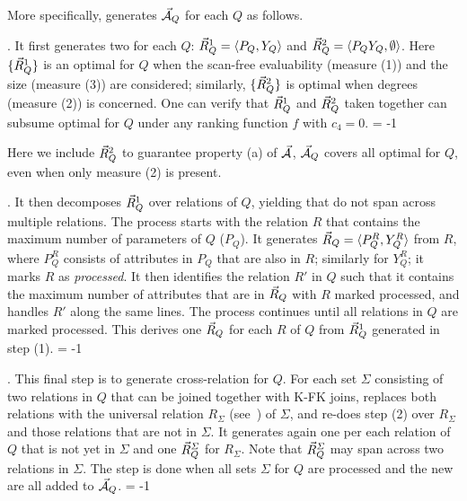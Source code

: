 More specifically, \usc generates $\vec{{\mathcal A}}_{Q}$ for each $Q$ as follows.

. It first generates two \bss for each $Q$:
$\vec{R}_{Q}^{1} = \langle P_{Q},\allowbreak Y_{Q}\rangle$ and $\vec{R}_{Q}^{2} =
\langle P_{Q}Y_{Q},\allowbreak \emptyset\rangle$. Here $\{\vec{R}_{Q}^{1}\}$ is
an optimal \bds for $Q$ when the scan-free evaluability (measure
(1))
and the size (measure (3)) are considered; similarly,
$\{\vec{R}_{Q}^{2}\}$ is optimal when degrees (measure (2)) is
concerned.
One can verify that $\vec{R}_{Q}^{1}$ and $\vec{R}_{Q}^{2}$ taken
together can subsume optimal \bdss for $Q$ under any ranking
function $f$ with $c_{4} = 0$.
\looseness = -1

\vspace{0.36ex}
Here we include $\vec{R}_{Q}^{2}$ %
to guarantee property (a)
of $\vec{{\mathcal A}}$, %
\ie $\vec{{\mathcal A}}_{Q}$ %
covers all optimal
\bdss for $Q$, even when only
measure (2) is present.



\vspace{0.36ex}

. It then decomposes $\vec{R}_{Q}^{1}$ over relations of
$Q$, yielding \bss that do not span across multiple relations. The
process starts with the relation $R$ that contains the maximum
number of parameters of $Q$ (\ie $P_{Q}$). It generates
$\vec{R}_{Q} = \langle P_{Q}^{R},\allowbreak Y_{Q}^{R}\rangle$ from $R$, where
$P_{Q}^{R}$ consists of attributes in $P_{Q}$ that are also in
$R$; similarly for $Y_{Q}^{R}$; it marks $R$ as {\em processed}.
It then identifies the relation $R'$ in $Q$ such that
  it contains the maximum
number of attributes that are in \bss $\vec{R}_{Q}$ with $R$
marked processed, and handles $R'$ along the same lines. The
process continues until all relations in $Q$ are marked
processed. This derives one \bs $\vec{R}_{Q}$ for each $R$ of $Q$
from $\vec{R}_{Q}^{1}$ generated in step (1). \looseness = -1

\vspace{0.36ex}

. This final step is to generate cross-relation \bss
for $Q$. For each set $\Sigma$ consisting of two relations in $Q$
that can be joined together with K-FK joins, \usc replaces both
relations with the universal relation $R_{\Sigma}$
(see~\cite{AbHuVi1995}) of $\Sigma$, and re-does step (2) over
$R_{\Sigma}$ and those relations that are not in $\Sigma$. It
generates again one \bs per each relation of $Q$ that is not yet
in $\Sigma$ and one \bs $\vec{R}_{Q}^{\Sigma}$ for $R_{\Sigma}$. Note
that $\vec{R}_{Q}^{\Sigma}$ may span across two relations in $\Sigma$.
The step is done %
when all sets $\Sigma$ for $Q$ are processed
and the new \bss are all added to $\vec{{\mathcal A}}_{Q}$. \looseness = -1

